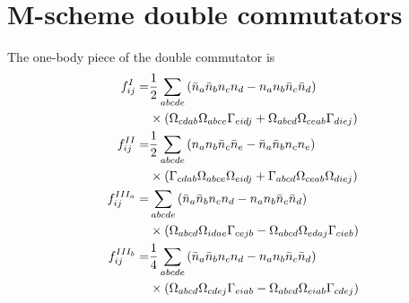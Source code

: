 \documentclass[11pt]{article}
\newcommand{\MyRomanNum}[1]{%
\ifcase#1\or I\or II\or III\or IV\or V\or VI\or VII\or VIII\or IX\or X\else #1\fi}
\begin{document}
\appendix


\section{M-scheme double commutators}
\label{appendix:M-scheme}
The one-body piece of the double commutator is
\begin{subequations}\allowdisplaybreaks[4]  \label{DoubleCommutator_onebody_all}
\begin{align}
 f^\MyRomanNum{1}_{ij}  =&\frac{1}{2} \sum_{abcde} \left( \bar{n}_a \bar{n}_b  {n}_c  {n}_d  -  {n}_a  {n}_b \bar{n}_c  \bar{n}_d  \right)   \nonumber \\
  &\times \left( \Omega_{cdab}\Omega_{abce}   \Gamma_{eidj}  +  \Omega_{abcd} \Omega_{ceab}  \Gamma_{diej}  \right)\\
  f^{\MyRomanNum{2}}_{ij}  =& \frac{1}{2} \sum_{abcde} \left( {n}_a  {n}_b  \bar{n}_c  \bar{n}_e  -   \bar{n}_a  \bar{n}_b  {n}_c  {n}_e  \right) \nonumber \\
 &\times  \left( \Gamma_{cdab} \Omega_{abce}   \Omega_{eidj}   + \Gamma_{abcd} \Omega_{ceab}  \Omega_{diej}  \right)  \\
f^{\MyRomanNum{3}_a}_{ij} =& \sum_{abcde} \left( \bar{n}_a  \bar{n}_b  {n}_c  {n}_d  -  {n}_a  {n}_b  \bar{n}_c  \bar{n}_d \right) \nonumber \\
 &\times   \left( \Omega_{abcd}  \Omega_{idae} \Gamma_{cejb}  -  \Omega_{abcd}  \Omega_{edaj} \Gamma_{cieb}  \right)\\
f^{\MyRomanNum{3}_b}_{ij}  =& \frac{1}{4} \sum_{abcde} \left( \bar{n}_a  \bar{n}_b  {n}_c {n}_d  -  {n}_a  {n}_b  \bar{n}_c  \bar{n}_d \right) \nonumber \\
 &\times   \left( \Omega_{abcd} \Omega_{cdej} \Gamma_{eiab} -  \Omega_{abcd} \Omega_{eiab} \Gamma_{cdej} \right)
\end{align}
\end{subequations}
\end{document}
